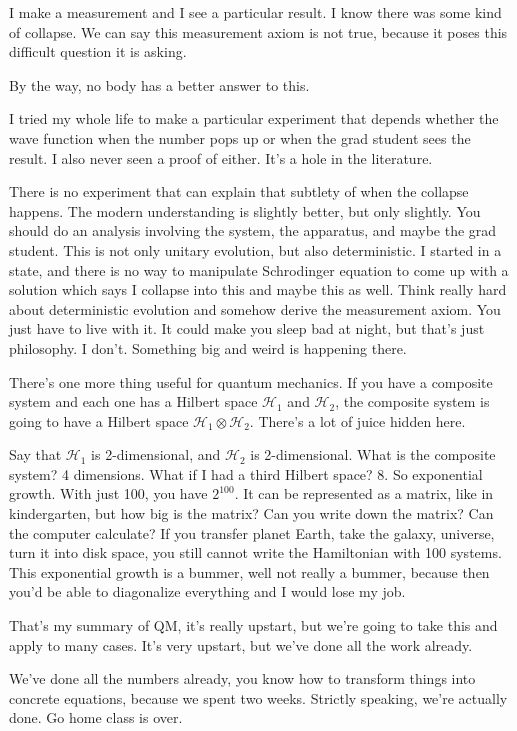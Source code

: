 I make a measurement and I see a particular result.
I know there was some kind of collapse.
We can say this measurement axiom is not true,
because it poses this difficult question it is asking.

By the way,
no body has a better answer to this.

I tried my whole life to make a particular experiment
that depends whether the wave function
when the number pops up or when the grad student sees the result.
I also never seen a proof of either.
It's a hole in the literature.

There is no experiment that can explain that subtlety of when the collapse
happens.
The modern understanding is slightly better,
but only slightly.
You should do an analysis involving the system,
the apparatus,
and maybe the grad student.
This is not only unitary evolution,
but also deterministic.
I started in a state,
and there is no way to manipulate Schrodinger equation
to come up with a solution which says I collapse into this
and maybe this as well.
Think really hard about deterministic evolution
and somehow derive the measurement axiom.
You just have to live with it.
It could make you sleep bad at night,
but that's just philosophy.
I don't.
Something big and weird is happening there.

There's one more thing useful for quantum mechanics.
If you have a composite system and each one has a Hilbert space $\mathcal{H}_1$
and $\mathcal{H}_2$,
the composite system is going to have a Hilbert space
$\mathcal{H}_1\otimes\mathcal{H}_2$.
There's a lot of juice hidden here.

Say that $\mathcal{H}_1$ is 2-dimensional,
and $\mathcal{H}_2$ is 2-dimensional.
What is the composite system?
4 dimensions.
What if I had a third Hilbert space? 8.
So exponential growth.
With just 100, you have $2^{100}$.
It can be represented as a matrix,
like in kindergarten,
but how big is the matrix?
Can you write down the matrix?
Can the computer calculate?
If you transfer planet Earth,
take the galaxy,
universe,
turn it into disk space,
you still cannot write the Hamiltonian with 100 systems.
This exponential growth is a bummer,
well not really a bummer,
because then you'd be able to diagonalize everything
and I would lose my job.

That's my summary of QM,
it's really upstart,
but we're going to take this and apply to many cases.
It's very upstart,
but we've done all the work already.

We've done all the numbers already,
you know how to transform things into concrete equations,
because we spent two weeks.
Strictly speaking, we're actually done.
Go home class is over.

